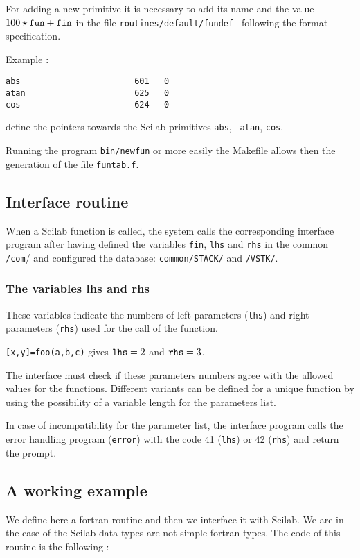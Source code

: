 For adding a new primitive it is necessary to add its name and the 
value $100\star \tt fun+fin$ in the file
\verb!routines/default/fundef ! following the format specification.

Example :
\begin{verbatim}
abs                       601   0
atan                      625   0
cos                       624   0
\end{verbatim}

define the pointers towards the Scilab primitives {\tt abs}, {\tt
atan}, {\tt cos}.  

Running the program {\tt bin/newfun} or more easily the Makefile 
allows then the generation of the file {\tt funtab.f}.


\subsection{Interface routine}

When a Scilab function is called, the system calls the corresponding
interface program after having defined the 
variables \verb!fin!,  \verb!lhs! and \verb!rhs! in the common \verb!/com!/
and  configured  the database:  \verb!common/STACK/!   and
\verb!/VSTK/!.

\subsubsection{The variables lhs and rhs}

These variables indicate the numbers  of left-parameters (\verb!lhs!)
and right-parameters (\verb!rhs!) used for the call of the function.

   \verb![x,y]=foo(a,b,c)!  gives  ${\tt
lhs}=2$ and ${\tt rhs}=3$.

The interface must check if these parameters numbers agree with the
allowed values for the functions. Different variants can be defined for 
a unique function by using the possibility of a variable length for
the parameters list.

In case of incompatibility for the parameter list, the interface program
calls the error handling program (\verb!error!) with the code  41   
(\verb!lhs!) or 42 (\verb!rhs!) and return the prompt.

\subsection{A working example}
We define here a fortran routine and then we interface it with Scilab.
We are in the case of the Scilab data types are not simple fortran types.
The code of this routine is the following :

